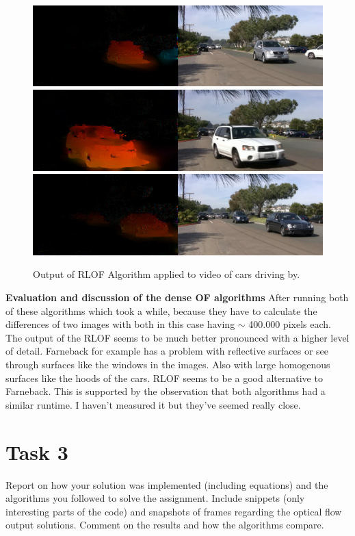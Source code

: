 \documentclass[UTF-8]{article}
\begin{document}
\begin{enumerate}[{Part} a.]
\begin{enumerate}[1.]
		\begin{figure}[H]
			\centering
			\includegraphics[width=0.9\linewidth]{_images/RLOF_cars1}
			\includegraphics[width=0.9\linewidth]{_images/RLOF_cars2}
			\includegraphics[width=0.9\linewidth]{_images/RLOF_cars3}
			\caption{Output of RLOF Algorithm applied to video of cars driving by.}
			\label{fig:rlofcars1}
		\end{figure}
	\end{enumerate}
\textbf{Evaluation and discussion of the dense OF algorithms}
After running both of these algorithms which took a while, because they have to calculate the differences of two images with both in this case having $\sim$ 400.000 pixels each. The output of the RLOF seems to be much better pronounced with a higher level of detail. Farneback for example has a problem with reflective surfaces or see through surfaces like the windows in the images. Also with large homogenous surfaces like the hoods of the cars. RLOF seems to be a good alternative to Farneback. This is supported by the observation that both algorithms had a similar runtime. I haven't measured it but they've seemed really close.
\end{enumerate}



\newpage
	\section*{Task 3}
	Report on how your solution was implemented (including equations) and the algorithms you
	followed to solve the assignment. Include snippets (only interesting parts of the code) and
	snapshots of frames regarding the optical flow output solutions. Comment on the results and how
	the algorithms compare.\\\\
	
\end{document}
